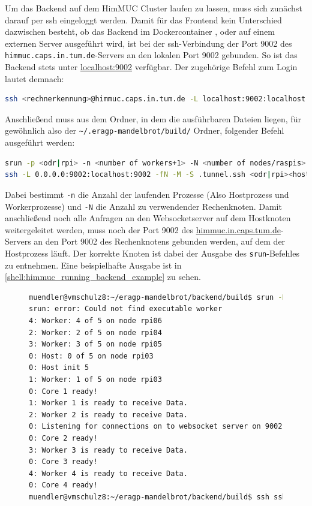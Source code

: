 Um das Backend auf dem HimMUC Cluster laufen zu lassen, muss sich zunächst darauf per ssh eingeloggt werden.
Damit für das Frontend kein Unterschied dazwischen besteht, ob das Backend im Dockercontainer , oder
auf einem externen Server ausgeführt wird, ist bei der ssh-Verbindung der Port 9002
des \verb|himmuc.caps.in.tum.de|-Servers an den lokalen Port 9002 gebunden.
So ist das Backend stets unter \url{localhost:9002} verfügbar.
Der zugehörige Befehl zum Login lautet demnach:

\begin{lstlisting}[language=bash]
ssh <rechnerkennung>@himmuc.caps.in.tum.de -L localhost:9002:localhost:9002
\end{lstlisting}

Anschließend muss aus dem Ordner, in dem die ausführbaren Dateien liegen,
für gewöhnlich also der \verb|~/.eragp-mandelbrot/build/| Ordner,
folgender Befehl ausgeführt werden:

\begin{lstlisting}[language=bash]
srun -p <odr|rpi> -n <number of workers+1> -N <number of nodes/raspis> -l --multi-prog <path to eragp-mandelbrot/backend>/himmuc/run.conf &
ssh -L 0.0.0.0:9002:localhost:9002 -fN -M -S .tunnel.ssh <odr|rpi><host number>
\end{lstlisting}

Dabei bestimmt \verb|-n| die Anzahl der laufenden Prozesse (Also Hostprozess und Workerprozesse)
und \verb|-N| die Anzahl zu verwendender Rechenknoten.
Damit anschließend noch alle Anfragen an den Websocketserver auf dem Hostknoten weitergeleitet werden,
muss noch der Port 9002 des \url{himmuc.in.caps.tum.de}-Servers an den Port 9002 des Rechenknotens gebunden werden,
auf dem der Hostprozess läuft.
Der korrekte Knoten ist dabei der Ausgabe des \verb|srun|-Befehles zu entnehmen.
Eine beispielhafte Ausgabe ist in \autoref{shell:himmuc_running_backend_example} zu sehen.

\begin{figure}[h]
	\begin{lstlisting}[language=bash, caption={Beispielhafter Start des Backends. Hierbei ist der Knoten des Hostprozesses \texttt{rpi03}.}, label={shell:himmuc_running_backend_example}]
muendler@vmschulz8:~/eragp-mandelbrot/backend/build$ srun -N4 -n5 -l --multi-prog ../himmuc/run.conf
srun: error: Could not find executable worker
4: Worker: 4 of 5 on node rpi06
2: Worker: 2 of 5 on node rpi04
3: Worker: 3 of 5 on node rpi05
0: Host: 0 of 5 on node rpi03
0: Host init 5
1: Worker: 1 of 5 on node rpi03
0: Core 1 ready!
1: Worker 1 is ready to receive Data.
2: Worker 2 is ready to receive Data.
0: Listening for connections on to websocket server on 9002
0: Core 2 ready!
3: Worker 3 is ready to receive Data.
0: Core 3 ready!
4: Worker 4 is ready to receive Data.
0: Core 4 ready!
muendler@vmschulz8:~/eragp-mandelbrot/backend/build$ ssh ssh -L 0.0.0.0:9002:localhost:9002 -fN -M -S .tunnel.ssh rpi03
    \end{lstlisting}
\end{figure}

